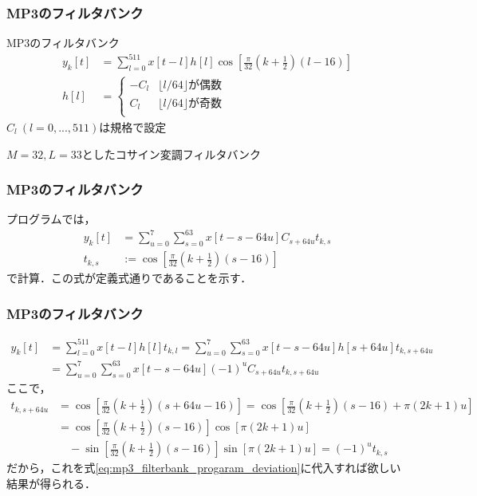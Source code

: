 \documentclass[14pt,xcolor=dvipsnames,table,dvipdfmx]{beamer}
\begin{document}
\begin{frame}[c]
    \frametitle{MP3のフィルタバンク}
    \begin{block}{MP3のフィルタバンク}
        \vspace{-10pt}
        \begin{align}
            y_{k}[t] &= \sum_{l = 0}^{511} x[t - l] h[l] \cos\left[ \frac{\pi}{32}\left( k + \frac{1}{2} \right) \left( l - 16 \right) \right] \\
            h[l] &= \left\{ \begin{array}{ll}
                -C_{l} & \lfloor l / 64 \rfloor \text{が偶数} \\
                 C_{l} & \lfloor l / 64 \rfloor \text{が奇数} \\
            \end{array} \right.
        \end{align}
        $C_{l}\ (l = 0,...,511)$は規格で設定
    \end{block}
    $M = 32, L = 33$としたコサイン変調フィルタバンク
\end{frame}

\begin{frame}[c]
    \frametitle{MP3のフィルタバンク}
    プログラムでは，
    \begin{align*}
        y_{k}[t] &= \sum_{u = 0}^{7} \sum_{s = 0}^{63} x[t - s - 64u] C_{s + 64u} t_{k,s} \\
        t_{k,s} &:= \cos\left[ \frac{\pi}{32}\left( k + \frac{1}{2} \right) \left( s - 16 \right) \right]
    \end{align*}
    で計算．この式が定義式通りであることを示す．
\end{frame}

\begin{frame}[c]
    \frametitle{MP3のフィルタバンク}
    \scriptsize
    \begin{align}
        y_{k}[t] &= \sum_{l = 0}^{511} x[t - l] h[l] t_{k,l} = \sum_{u = 0}^{7} \sum_{s = 0}^{63} x[t - s - 64u] h[s + 64u] t_{k,s+64u} \nonumber \\
        &= \sum_{u = 0}^{7} \sum_{s = 0}^{63} x[t - s - 64u] (-1)^{u} C_{s + 64u} t_{k,s+64u} \label{eq:mp3_filterbank_progaram_deviation}
    \end{align}
    ここで，
    \begin{align*}
        t_{k,s+64u} &= \cos\left[ \frac{\pi}{32} \left( k + \frac{1}{2} \right) (s + 64u - 16) \right] = \cos\left[ \frac{\pi}{32} \left( k + \frac{1}{2} \right) (s - 16) + \pi \left( 2k + 1 \right) u \right] \\
        &= \cos\left[ \frac{\pi}{32} \left( k + \frac{1}{2} \right) (s - 16) \right]\cos\left[ \pi(2k + 1)u \right] \\
        &\quad - \sin\left[ \frac{\pi}{32} \left( k + \frac{1}{2} \right) (s - 16) \right]\sin\left[ \pi(2k + 1)u \right]
        = (-1)^{u} t_{k,s}
    \end{align*}
    だから，これを式\eqref{eq:mp3_filterbank_progaram_deviation}に代入すれば欲しい結果が得られる．
\end{frame}
\end{document}
